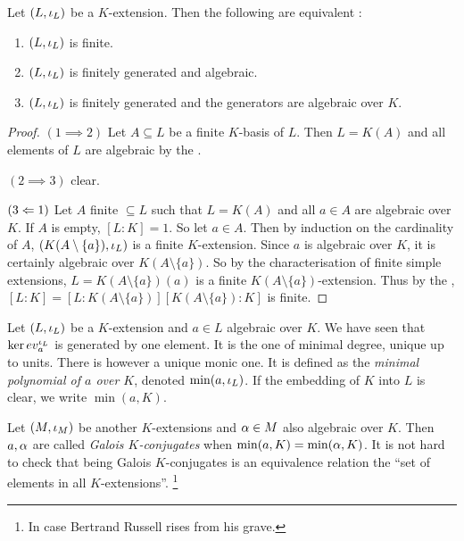 \documentclass[main.tex]{subfiles}
\begin{document}
\begin{thm} 
  
  Let $(L,\iota_L)$ be a $K$-extension.
  Then the following are equivalent : 
  \begin{enumerate}
    \item $(L,\iota_L)$ is finite. 
    \item $(L,\iota_L)$ is finitely generated and algebraic.   
    \item $(L,\iota_L)$ is finitely generated and 
    the generators are algebraic over $K$. 
  \end{enumerate}
\end{thm}
\begin{proof}
  $(1 \implies 2)$ Let $A \subseteq L$ be a finite $K$-basis of $L$. 
  Then $L = K(A)$ and all elements of $L$ are algebraic by 
  the . 

  $(2 \implies 3)$ clear. 

  $(3 \Leftarrow 1)$ Let $A$ finite $\subseteq L$ such that $L = K(A)$
  and all $a \in A$ are algebraic over $K$. 
  If $A$ is empty, $[L : K] = 1$. 
  So let $a \in A$. 
  Then by induction on the cardinality of $A$, 
  $(K(A\setminus\{a\}),\iota_L)$ is a finite $K$-extension. 
  Since $a$ is algebraic over $K$, 
  it is certainly algebraic over $K(A\setminus\{a\})$. 
  So by the 
  {characterisation of finite simple extensions}, 
  $L = K(A\setminus\{a\})(a)$ is a finite $K(A\setminus\{a\})$-extension. 
  Thus by the , 
  $[L : K] = [L : K(A\setminus\{a\})][K(A\setminus\{a\}) : K]$
  is finite. 
\end{proof}

\begin{dfn}  
  
  Let $(L,\iota_L)$ be a $K$-extension and $a \in L$ algebraic over $K$. 
  We have seen that $\ker ev_a^{\iota_L}$ is generated by one element.
  It is the one of minimal degree, unique up to units. 
  There is however a unique monic one. 
  It is defined as the \emph{minimal polynomial of $a$ over $K$},
  denoted $\min(a,\iota_L)$. 
  If the embedding of $K$ into $L$ is clear, we write $\min(a,K)$. 

  Let $(M,\iota_M)$ be another $K$-extensions and 
  $\alpha \in M$ also algebraic over $K$. 
  Then $a, \alpha$ are called \emph{Galois $K$-conjugates} when 
  $\min(a,K) = \min(\alpha, K)$. 
  It is not hard to check that being Galois $K$-conjugates is 
  an equivalence relation the ``set of elements in all $K$-extensions''. 
  \footnote{In case Bertrand Russell rises from his grave.}
\end{dfn}
\end{document}
